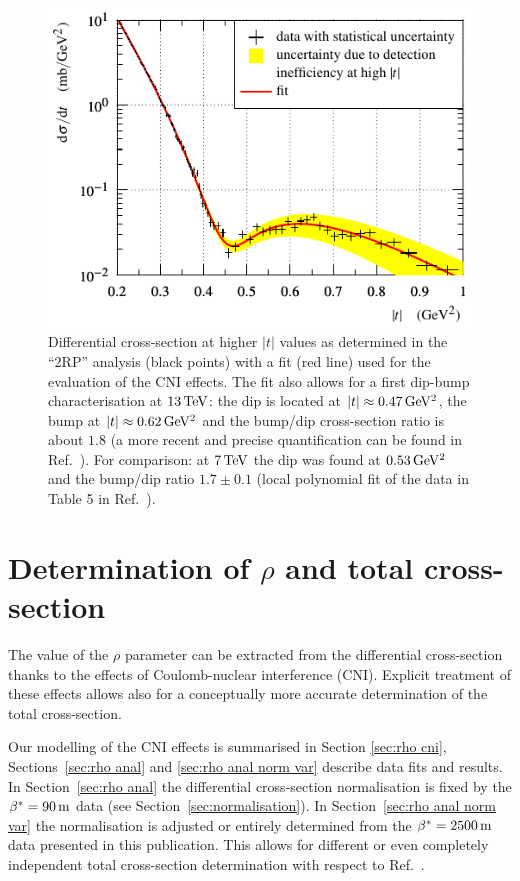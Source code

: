 \begin{figure}
\begin{center}
\includegraphics{fig/high_t_description.pdf}
\caption{%
Differential cross-section at higher $|t|$ values as determined in the ``2RP'' analysis (black points) with a fit (red line) used for the evaluation of the CNI effects. The fit also allows for a first dip-bump characterisation at $13\,{\rm TeV}$: the dip is located at $|t| \approx 0.47\,{\rm GeV^2}$, the bump at $|t|\approx 0.62\,{\rm GeV^2}$ and the bump/dip cross-section ratio is about $1.8$ (a more recent and precise quantification can be found in Ref.~\cite{totem-13tev-el-diff}). For comparison: at $7\,{\rm TeV}$ the dip was found at $0.53\,{\rm GeV^2}$ \cite{totem-7tev-first} and the bump/dip ratio $1.7\pm 0.1$ (local polynomial fit of the data in Table 5 in Ref.~\cite{totem-7tev-el}).
}
\label{fig:high t desc}
\end{center}
\end{figure}

\section{Determination of $\rho$ and total cross-section}
\label{sec:rho}

The value of the $\rho$ parameter can be extracted from the differential cross-section thanks to the effects of Coulomb-nuclear interference (CNI). Explicit treatment of these effects allows also for a conceptually more accurate determination of the total cross-section. 

Our modelling of the CNI effects is summarised in Section \ref{sec:rho cni}, Sections~\ref{sec:rho anal} and \ref{sec:rho anal norm var} describe data fits and results. In Section~\ref{sec:rho anal} the differential cross-section normalisation is fixed by the $\beta^* = 90\,{\rm m}$ data \cite{totem-13tev-90m} (see Section~\ref{sec:normalisation}). In Section~\ref{sec:rho anal norm var} the normalisation is adjusted or entirely determined from the $\beta^* = 2500\,{\rm m}$ data presented in this publication. This allows for different or even completely independent total cross-section determination with respect to Ref.~\cite{totem-13tev-90m}.




